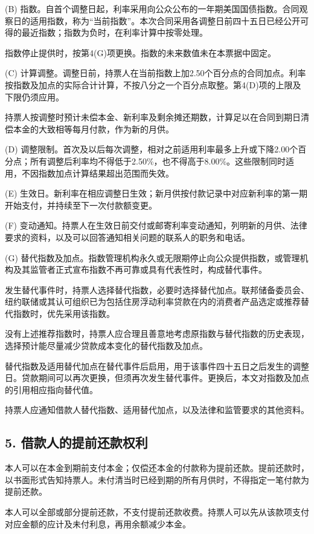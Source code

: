 \documentclass[UTF8,fontset=none,11pt,a4paper]{ctexart}
\begin{document}
(B) 指数。自首个调整日起，利率采用向公众公布的一年期美国国债指数。合同观察日的适用指数，称为“当前指数”。本次合同采用各调整日前四十五日已经公开可得的最近指数；指数为负时，在利率计算中按零处理。


指数停止提供时，按第4(G)项更换。指数的未来数值未在本票据中固定。


(C) 计算调整。调整日前，持票人在当前指数上加2.50个百分点的合同加点。利率按指数及加点的实际合计计算，不按八分之一个百分点取整。第4(D)项的上限及下限仍须应用。


持票人按调整时预计未偿本金、新利率及剩余摊还期数，计算足以在合同到期日清偿本金的大致相等每月付款，作为新的月供。


(D) 调整限制。首次及以后每次调整，相对之前适用利率最多上升或下降2.00个百分点；所有调整后利率均不得低于2.50\%，也不得高于8.00\%。这些限制同时适用，不因指数加点计算结果超出范围而失效。


(E) 生效日。新利率在相应调整日生效；新月供按付款记录中对应新利率的第一期开始支付，并持续至下一次付款额变更。


(F) 变动通知。持票人在生效日前交付或邮寄利率变动通知，列明新的月供、法律要求的资料，以及可以回答通知相关问题的联系人的职务和电话。


(G) 替代指数及加点。指数管理机构永久或无限期停止向公众提供指数，或管理机构及其监管者正式宣布指数不再可靠或具有代表性时，构成替代事件。


发生替代事件时，持票人选择替代指数，必要时选择替代加点。联邦储备委员会、纽约联储或其认可组织已为包括住房浮动利率贷款在内的消费者产品选定或推荐替代指数时，优先采用该指数。


没有上述推荐指数时，持票人应合理且善意地考虑原指数与替代指数的历史表现，选择预计能尽量减少贷款成本变化的替代指数及加点。


替代指数及适用替代加点在替代事件后启用，用于该事件四十五日之后发生的调整日。贷款期间可以再次更换，但须再次发生替代事件。更换后，本文对指数及加点的引用相应指向替代值。


持票人应通知借款人替代指数、适用替代加点，以及法律和监管要求的其他资料。


\subsection*{5. 借款人的提前还款权利}
本人可以在本金到期前支付本金；仅偿还本金的付款称为提前还款。提前还款时，以书面形式告知持票人。未付清当时已经到期的所有月供时，不得指定一笔付款为提前还款。


本人可以全部或部分提前还款，不支付提前还款收费。持票人可以先从该款项支付对应金额的应计及未付利息，再用余额减少本金。
\end{document}
